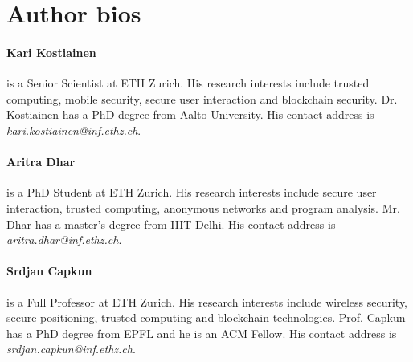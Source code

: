 \documentclass[letterpaper,twocolumn,10pt]{article}
\begin{document}
\section*{Author bios}

\begin{tcolorbox}

\paragraph{Kari Kostiainen} is a Senior Scientist at ETH Zurich. His research interests include trusted computing, mobile security, secure user interaction and blockchain security. Dr. Kostiainen has a PhD degree from Aalto University. His contact address is \emph{kari.kostiainen@inf.ethz.ch}.

\vspace{10pt}
\paragraph{Aritra Dhar} is a PhD Student at ETH Zurich. His research interests include secure user interaction, trusted computing, anonymous networks and program analysis. Mr. Dhar has a master's degree from IIIT Delhi. His contact address is \emph{aritra.dhar@inf.ethz.ch}.

\vspace{10pt}
\paragraph{Srdjan Capkun} is a Full Professor at ETH Zurich. His research interests include wireless security, secure positioning, trusted computing and blockchain technologies. Prof. Capkun has a PhD degree from EPFL and he is an ACM Fellow. His contact address is \emph{srdjan.capkun@inf.ethz.ch}.

\end{tcolorbox}
\end{document}
